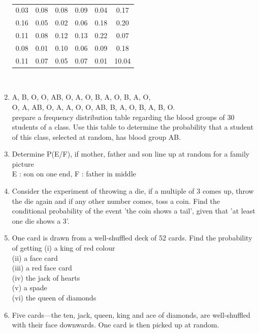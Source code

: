 \begin{enumerate}[label=\thesection.\arabic*.,ref=\thesection.\theenumi]
\begin{table}[!ht]
\begin{tabular}{ cccccc}
  0.03 &0.08 &0.08 &0.09 &0.04 &0.17 \\
 0.16 &0.05 &0.02 &0.06 &0.18 &0.20 \\
 0.11 &0.08 &0.12 &0.13 &0.22 &0.07  \\
 0.08 &0.01 &0.10 &0.06 &0.09 &0.18 \\ 
  0.11 &0.07 &0.05 &0.07 &0.01 &10.04 \\ 
 \end{tabular}\\
\caption{}
\label{table:1.2.10}
\end{table}
\solution

\item  
A, B, O, O, AB, O, A, O, B, A, O, B, A, O,\\ O,
A, AB, O, A, A, O, O, AB, B, A, O, B, A, B, O.\\
prepare a frequency distribution table regarding the blood groups of 30 students of a class. Use this table to determine the probability that a student of this class, selected at random, has blood group AB.\\
\item Determine P(E/F), if mother, father and son line up at random for a family picture\\
E : son on one end, F : father in middle\\
\item Consider the experiment of throwing a die, if a multiple of 3 comes up, throw the die again and if any other number comes, toss a coin. Find the conditional probability of the event 'the coin shows a tail', given that 'at least one die shows a 3'.\\
\solution

\item One card is drawn from a well-shuffled deck of 52 cards. Find the probability of getting
(i) a king of red colour\\
(ii) a face card\\
(iii) a red face card\\
(iv) the jack of hearts \\
(v) a spade \\
(vi) the queen of diamonds
\\
\solution

\item Five cards—the ten, jack, queen, king and ace of diamonds, are well-shuffled with their
face downwards. One card is then picked up at random.\\

\end{enumerate}
